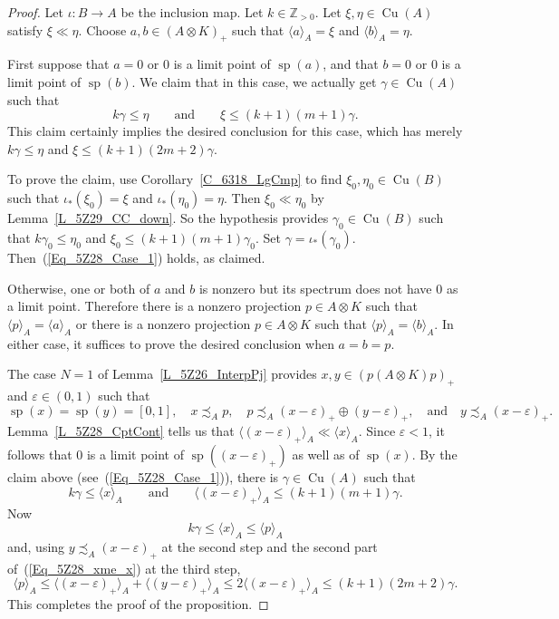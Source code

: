 \documentclass[10pt]{amsart}
\numberwithin{equation}{section}
\theoremstyle{definition}
\newcommand{\gm}{\gamma}
\newcommand{\ep}{\varepsilon}
\newcommand{\et}{\eta}
\newcommand{\io}{\iota}
\newcommand{\N}{{\mathbb{Z}}_{> 0}}
\newcommand{\spec}{{\operatorname{sp}}}
\newcommand{\Cu}{{\operatorname{Cu}}}
\newcommand{\andeqn}{\qquad {\mbox{and}} \qquad}
\newcommand{\nzp}{nonzero projection}
\newcommand{\cc}[1]{\langle #1 \rangle}
\begin{document}
\begin{proof}
Let $\io \colon B \to A$ be the inclusion map.
Let $k \in \N$.
Let $\xi, \et \in \Cu (A)$ satisfy $\xi \ll \et$.
Choose $a, b \in (A \otimes K)_{+}$ such that
$\cc{a}_A = \xi$ and $\cc{b}_A = \et$.

First suppose that $a = 0$ or $0$ is a limit point of
$\spec (a)$, and that $b = 0$ or $0$ is a limit point of $\spec (b)$.
We claim that in this case, we
actually get $\gm \in \Cu (A)$ such that
%
\begin{equation}\label{Eq_5Z28_Case_1}
k \gm \leq \et
\andeqn
\xi \leq (k + 1) (m + 1) \gm.
\end{equation}
%
This claim certainly implies the desired conclusion for
this case, which has merely $k \gm \leq \et$ and
$\xi \leq (k + 1) (2 m + 2) \gm$.

To prove the claim, use Corollary~\ref{C_6318_LgCmp}
to find $\xi_0, \et_0 \in \Cu (B)$
such that $\io_* (\xi_0) = \xi$ and $\io_* (\et_0) = \et$.
Then $\xi_0 \ll \et_0$ by Lemma~\ref{L_5Z29_CC_down}.
So the hypothesis provides $\gm_0 \in \Cu (B)$
such that $k \gm_0 \leq \et_0$ and
$\xi_0 \leq (k + 1) (m + 1) \gm_0$.
Set $\gm = \io_* (\gm_0)$.
Then~(\ref{Eq_5Z28_Case_1}) holds, as claimed.

Otherwise, one or both of $a$ and $b$ is nonzero but
its spectrum does not have $0$ as a limit point.
Therefore there is a \nzp{} $p \in A \otimes K$
such that $\cc{p}_A = \cc{a}_A$ or there is a \nzp{}
$p \in A \otimes K$ such that $\cc{p}_A = \cc{b}_A$.
In either case, it suffices to prove the desired
conclusion when $a = b = p$.

The case $N = 1$ of Lemma~\ref{L_5Z26_InterpPj} provides
$x, y \in (p (A \otimes K) p)_{+}$ and $\ep \in (0, 1)$
such that
\[
\spec (x) = \spec (y) = [0, 1],
\quad
x \precsim_A p,
\quad
p \precsim_A (x - \ep)_{+} \oplus (y - \ep)_{+},
\quad {\mbox{and}} \quad
y \precsim_A (x - \ep)_{+}.
\]
Lemma~\ref{L_5Z28_CptCont} tells us that
$\cc{(x - \ep)_{+}}_A \ll \cc{x}_A$.
Since $\ep < 1$,
it follows that $0$ is a limit point of
$\spec ((x - \ep)_{+})$ as well as of $\spec (x)$.
By the claim above (see~(\ref{Eq_5Z28_Case_1})),
there is $\gm \in \Cu (A)$ such that
%
\begin{equation}\label{Eq_5Z28_xme_x}
k \gm \leq \cc{x}_A
\andeqn
\cc{(x - \ep)_{+}}_A \leq (k + 1) (m + 1) \gm.
\end{equation}
%
Now
\[
k \gm \leq \cc{x}_A \leq \cc{p}_A
\]
and, using $y \precsim_A (x - \ep)_{+}$ at the second
step and the second part of~(\ref{Eq_5Z28_xme_x}) at the
third step,
\[
\cc{p}_A \leq \cc{(x - \ep)_{+}}_A +
\cc{(y - \ep)_{+}}_A
\leq 2 \cc{(x - \ep)_{+}}_A
\leq (k + 1) (2 m + 2) \gm.
\]
This completes the proof of the proposition.
\end{proof}
\end{document}
